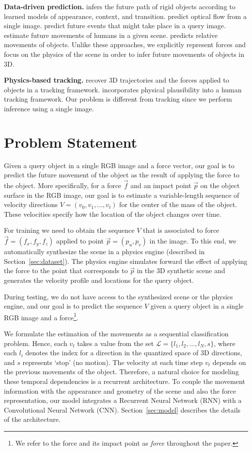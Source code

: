 \documentclass[runningheads]{llncs}
\begin{document}
\textbf{Data-driven prediction.} \cite{walker14} infers the future path of rigid objects according to learned models of appearance, context, and transition. \cite{pintea14,walker15} predict optical flow from a single image. \cite{yuen10} predict future events that might take place in a query image. \cite{kitani12} estimate future movements of humans in a given scene. \cite{fouhey14} predicts relative movements of objects. Unlike these approaches, we explicitly represent forces and focus on the physics of the scene in order to infer future movements of objects in 3D.

\textbf{Physics-based tracking.} \cite{salzmann11} recover 3D trajectories and the forces applied to objects in a tracking framework. \cite{vondrak08} incorporates physical plausibility into a human tracking framework. Our problem is different from tracking since we perform inference using a single image.


\section{Problem Statement}
\label{sec:problem}
Given a query object in a single RGB image and a force vector, our goal is to predict the future movement of the object as the result of applying the force to the object. More specifically, for a force $\vec{f}$ and an impact point $\vec{p}$ on the object surface in the RGB image, our goal is to estimate a variable-length sequence of velocity directions $V=(v_0, v_1, \ldots, v_t)$ for the center of the mass of the object. These velocities specify how the location of the object changes over time.  

For training we need to obtain the sequence $V$ that is associated to force $\vec{f}=(f_x,f_y,f_z)$ applied to point $\vec{p}=(p_u,p_v)$ in the image. To this end, we automatically synthesize the scene in a physics engine (described in Section~\ref{sec:dataset}). The physics engine simulates forward the effect of applying the force to the point that corresponds to $\vec{p}$ in the 3D synthetic scene and generates the velocity profile and locations for the query object.

During testing, we do not have access to the synthesized scene or the physics engine, and our goal is to predict the sequence $V$ given a query object in a single RGB image and a force\footnote{We refer to the force and its impact point as \emph{force} throughout the paper.}.

We formulate the estimation of the movements as a sequential classification problem. Hence, each $v_t$ takes a value from the set $\mathcal{L}=\{l_1, l_2,\ldots, l_N, s \}$, where each $l_i$ denotes the index for a direction in the quantized space of 3D directions, and $s$ represents `stop' (no motion). The velocity at each time step $v_t$ depends on the previous movements of the object. Therefore, a natural choice for modeling these temporal dependencies is a recurrent architecture. To couple the movement information with the appearance and geometry of the scene and also the force representation, our model integrates a Recurrent Neural Network (RNN) with a Convolutional Neural Network (CNN). Section~\ref{sec:model} describes the details of the architecture.
\end{document}

